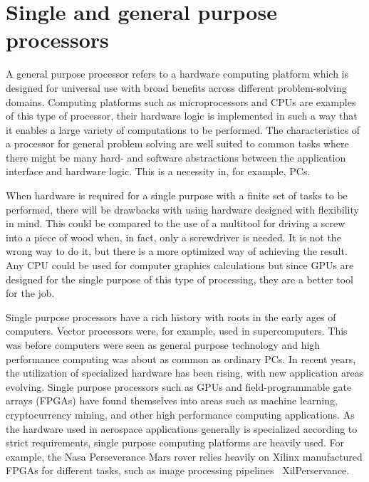 \documentclass[12pt]{report}
\begin{document}
\section{Single and general purpose processors}
A general purpose processor refers to a hardware computing platform which is designed for universal use with broad benefits across different problem-solving domains. Computing platforms such as microprocessors and CPUs are examples of this type of processor, their hardware logic is implemented in such a way that it enables a large variety of computations to be performed. 
The characteristics of a processor for general problem solving are well suited to common tasks where there might be many hard- and software abstractions between the application interface and hardware logic. This is a necessity in, for example, PCs.
\par
When hardware is required for a single purpose with a finite set of tasks to be performed, there will be drawbacks with using hardware designed with flexibility in mind. This could be compared to the use of a multitool for driving a screw into a piece of wood when, in fact, only a screwdriver is needed. It is not the wrong way to do it, but there is a more optimized way of achieving the result. Any CPU could be used for computer graphics calculations but since GPUs are designed for the single purpose of this type of processing, they are a better tool for the job.
\par
Single purpose processors have a rich history with roots in the early ages of computers. Vector processors were, for example, used in supercomputers.
This was before computers were seen as general purpose technology and high performance computing was about as common as ordinary PCs.
In recent years, the utilization of specialized hardware has been rising, with new application areas evolving. Single purpose processors such as GPUs and field-programmable gate arrays (FPGAs) have found themselves into areas such as machine learning, cryptocurrency mining, and other high performance computing applications.
As the hardware used in aerospace applications generally is specialized according to strict requirements, single purpose computing platforms are heavily used. For example, the Nasa Perseverance Mars rover relies heavily on Xilinx manufactured FPGAs for different tasks, such as image processing pipelines \
{XilPerservance}.
\end{document}
